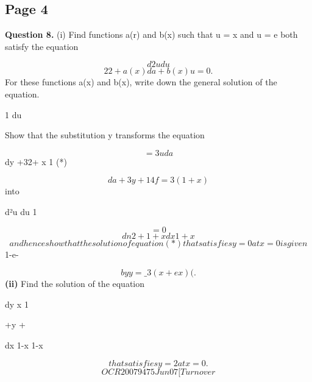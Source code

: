 \documentclass[12pt]{article}
\begin{document}
\subsection*{Page 4}
\begin{flushleft}
\bigskip\textbf{Question 8.} (i) Find functions a(r) and b(x) such that u = x and u = e both satisfy the equation\par
\[d2u du\]
\[22 + a(x) da +b(x)u = 0.\]
For these functions a(x) and b(x), write down the general solution of the equation.\par
1 du\par
Show that the substitution y transforms the equation\par
\[= 3u da\]
dy +32+ x 1 (*)\par
\[da +3y + 14 f= 3(1+x)\]
into\par
d²u du 1\par
\[=0\]
\[dn2 + 1+ x dx 1+x\]
\[and hence show that the solution of equation (*) that satisfies y = 0 at x = 0 is given\]
1-e-\par
\[by y =\_3(x+ex)(.\]
\textbf{(ii)} Find the solution of the equation\par
dy x 1\par
+y +\par
dx 1-x 1-x\par
\[that satisfies y = 2 at x = 0.\]
\[OCR 2007 9475 Jun07 [Turn over\]
\end{flushleft}
\end{document}
